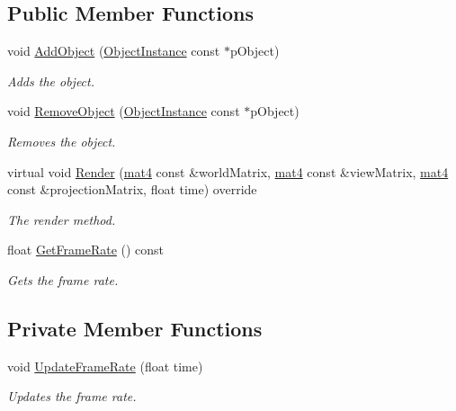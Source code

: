 \subsection*{Public Member Functions}
\begin{DoxyCompactItemize}
\item 
void \hyperlink{class_render_manager_a289e8b7de820f26e461e587299cc4603}{Add\+Object} (\hyperlink{class_object_instance}{Object\+Instance} const $\ast$p\+Object)
\begin{DoxyCompactList}\small\item\em Adds the object. \end{DoxyCompactList}\item 
void \hyperlink{class_render_manager_a1742cd0a1cb87f41a867c70d327997da}{Remove\+Object} (\hyperlink{class_object_instance}{Object\+Instance} const $\ast$p\+Object)
\begin{DoxyCompactList}\small\item\em Removes the object. \end{DoxyCompactList}\item 
virtual void \hyperlink{class_render_manager_aa51d440b124cf2a1744655b1b24369f5}{Render} (\hyperlink{_types_8h_a2db59f395fe82a7394c6324956c265d8}{mat4} const \&world\+Matrix, \hyperlink{_types_8h_a2db59f395fe82a7394c6324956c265d8}{mat4} const \&view\+Matrix, \hyperlink{_types_8h_a2db59f395fe82a7394c6324956c265d8}{mat4} const \&projection\+Matrix, float time) override
\begin{DoxyCompactList}\small\item\em The render method. \end{DoxyCompactList}\item 
float \hyperlink{class_render_manager_adf349b75703a57a8be9b4cd1a1825494}{Get\+Frame\+Rate} () const 
\begin{DoxyCompactList}\small\item\em Gets the frame rate. \end{DoxyCompactList}\end{DoxyCompactItemize}
\subsection*{Private Member Functions}
\begin{DoxyCompactItemize}
\item 
void \hyperlink{class_render_manager_a85483a27c84d7e11ea6bf12bfd984f28}{Update\+Frame\+Rate} (float time)
\begin{DoxyCompactList}\small\item\em Updates the frame rate. \end{DoxyCompactList}\end{DoxyCompactItemize}
